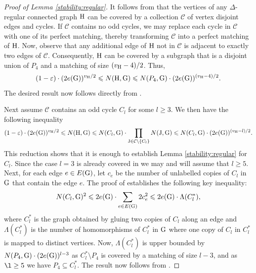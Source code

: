 \documentclass[a4paper,11pt,english,reqno]{amsart}
\numberwithin{equation}{section}
\renewcommand{\leq}{\leqslant}
\renewcommand{\geq}{\geqslant}
\newcommand{\uH}{\textup{H}}
\newcommand{\tu}[1]{\textup{#1}}
\begin{document}
\begin{proof}[Proof of Lemma \ref{stability:regular}]
It follows from \cite[Lemma~5.1]{HMS} that the vertices of any $\Delta$-regular connected graph $\uH$ can be covered by a collection $\mathcal{C}$ of vertex disjoint edges and cycles. If  $\mathcal{C}$ contains no odd cycles,  we may replace each cycle in $\mathcal{C}$ with one of its perfect matching, thereby transforming $\mathcal{C}$ into a perfect matching of $\uH$. Now, observe that any additional edge of $\uH$ not in $\mathcal{C}$ is adjacent to exactly two edges of $\mathcal{C}$. Consequently, $\uH$ can be covered by a subgraph that is a disjoint union of $P_{4}$ %
and a matching of size $(v_{\uH}-4)/2$. Thus,
\begin{equation}
	(1-\varepsilon)\cdot (2e(\tu{G}))^{v_{\uH}/2}\leq N(\uH,\tu{G})\leq N(P_{4},\tu{G})\cdot (2e(\tu{G}))^{(v_{\uH}-4)/2}.
\end{equation} 
The desired result now follows directly from  \cite[Claim~5.12]{HMS}. 

Next assume $\mathcal{C}$ contains an odd cycle $C_{l}$ for some $l\geq 3$. We then have the following inequality
\begin{equation*}
	(1-\varepsilon)\cdot  (2e(\tu{G}))^{v_{\uH}/2}\leq N(\uH, \tu{G})\leq N(C_{l}, \tu{G})\cdot \prod_{\tu{J}\in \mathcal{C}\setminus\{C_l\}} N(\tu{J}, \tu{G}) \leq N(C_{l}, \tu{G})\cdot (2e(\tu{G}))^{(v_{\uH}-l)/2}.
\end{equation*} 
This reduction shows that it is enough to establish Lemma \ref{stability:regular} for $C_l$. Since the case $l=3$ is already covered in \cite[Claim 5.13]{HMS} we may and will assume that $l \geq 5$. Next, for each edge $e\in E(\tu{G})$, let $c_{e}$ be the number of unlabelled copies of $C_{l}$ in $\tu{G}$ that contain the edge $e$. The proof of \cite[Lemma~5.5]{HMS} establishes the following key inequality:
\begin{equation*}
	N(C_{l}, \tu{G})^{2}\leq 2e(\tu{G})\cdot \sum_{e\in E(\tu{G})}2c_{e}^{2}\leq 2e(\tu{G})\cdot \Lambda(C_{l}^{*}),
\end{equation*}
where $C_{l}^{*}$ is the graph obtained by gluing two copies of $C_{l}$ along an edge and $\Lambda(C_{l}^{*})$ is the number of homomorphisms of $C_{l}^{*}$ in $\tu{G}$ where one copy of $C_{l}$ in $C_{l}^{*}$ is mapped to distinct vertices. Now, $\Lambda(C_{l}^{*})$ is upper bounded by $N(P_{4},\tu{G})\cdot (2e(\tu{G}))^{l-3}$ as $C_{l}^{*}\setminus P_{4}$ is covered by a matching of size $l-3$, and as $\l \ge 5$ we have $P_4 \subseteq C^{*}_{l}$. The result now follows from \cite[Claim~5.12]{HMS}.
\end{proof}
\end{document}

